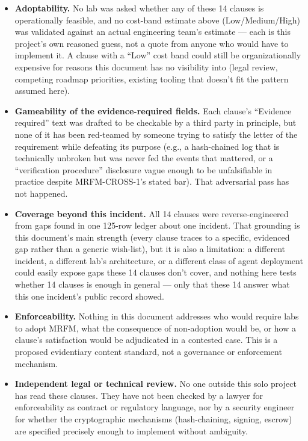\begin{itemize}
\item \textbf{Adoptability.} No lab was asked whether any of these 14 clauses is operationally feasible, and no cost-band estimate above (Low/Medium/High) was validated against an actual engineering team's estimate --- each is this project's own reasoned guess, not a quote from anyone who would have to implement it. A clause with a ``Low'' cost band could still be organizationally expensive for reasons this document has no visibility into (legal review, competing roadmap priorities, existing tooling that doesn't fit the pattern assumed here).
\item \textbf{Gameability of the evidence-required fields.} Each clause's ``Evidence required'' text was drafted to be checkable by a third party in principle, but none of it has been red-teamed by someone trying to satisfy the letter of the requirement while defeating its purpose (e.g., a hash-chained log that is technically unbroken but was never fed the events that mattered, or a ``verification procedure'' disclosure vague enough to be unfalsifiable in practice despite MRFM-CROSS-1's stated bar). That adversarial pass has not happened.
\item \textbf{Coverage beyond this incident.} All 14 clauses were reverse-engineered from gaps found in one 125-row ledger about one incident. That grounding is this document's main strength (every clause traces to a specific, evidenced gap rather than a generic wish-list), but it is also a limitation: a different incident, a different lab's architecture, or a different class of agent deployment could easily expose gaps these 14 clauses don't cover, and nothing here tests whether 14 clauses is enough in general --- only that these 14 answer what this one incident's public record showed.
\item \textbf{Enforceability.} Nothing in this document addresses who would require labs to adopt MRFM, what the consequence of non-adoption would be, or how a clause's satisfaction would be adjudicated in a contested case. This is a proposed evidentiary content standard, not a governance or enforcement mechanism.
\item \textbf{Independent legal or technical review.} No one outside this solo project has read these clauses. They have not been checked by a lawyer for enforceability as contract or regulatory language, nor by a security engineer for whether the cryptographic mechanisms (hash-chaining, signing, escrow) are specified precisely enough to implement without ambiguity.
\end{itemize}

